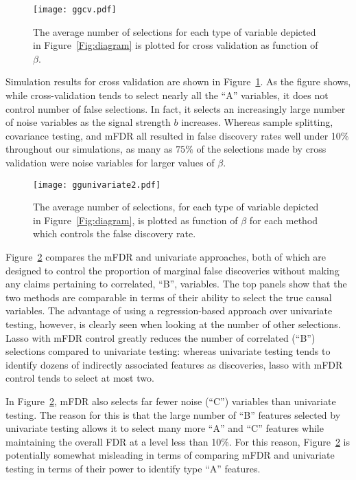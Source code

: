 \begin{figure} [!ht]
 \centering
  \texttt{[image: ggcv.pdf]}
  \caption{\label{Fig:cv} The average number of selections for each type of variable depicted in Figure~\ref{Fig:diagram} is plotted for cross validation as function of $\beta$.}
\end{figure}


Simulation results for cross validation are shown in Figure~\ref{Fig:cv}.  As the figure shows, while cross-validation tends to select nearly all the ``A'' variables, it does not control number of false selections.  In fact, it selects an increasingly large number of noise variables as the signal strength $b$ increases. Whereas sample splitting, covariance testing, and mFDR all resulted in false discovery rates well under 10\% throughout our simulations, as many as $75\%$ of the selections made by cross validation were noise variables for larger values of $\beta$.

\begin{figure} [!htb]
 \centering
  \texttt{[image: ggunivariate2.pdf]}
  \caption{\label{Fig:univariate} The average number of selections, for each type of variable depicted in Figure~\ref{Fig:diagram}, is plotted as function of $\beta$ for each method which controls the false discovery rate.}
\end{figure}

Figure~\ref{Fig:univariate} compares the mFDR and univariate approaches, both of which are designed to control the proportion of marginal false discoveries without making any claims pertaining to correlated, ``B'', variables. The top panels show that the two methods are comparable in terms of their ability to select the true causal variables.  The advantage of using a regression-based approach over univariate testing, however, is clearly seen when looking at the number of other selections.  Lasso with mFDR control greatly reduces the number of correlated (``B'') selections compared to univariate testing: whereas univariate testing tends to identify dozens of indirectly associated features as discoveries, lasso with mFDR control tends to select at most two.

In Figure~\ref{Fig:univariate}, mFDR also selects far fewer noise (``C'') variables than univariate testing.  The reason for this is that the large number of ``B'' features selected by univariate testing allows it to select many more ``A'' and ``C'' features while maintaining the overall FDR at a level less than 10\%.  For this reason, Figure~\ref{Fig:univariate} is potentially somewhat misleading in terms of comparing mFDR and univariate testing in terms of their power to identify type ``A'' features.

